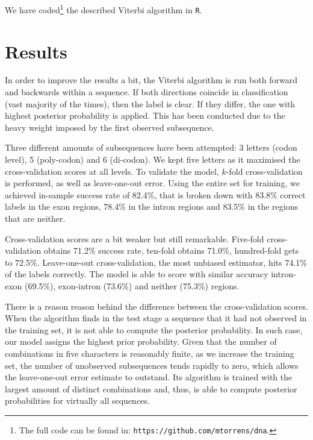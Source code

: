 \documentclass[a4paper, 11pt]{article} %
\begin{document}
We have coded\footnote{The full code can be found in: \texttt{https://github.com/mtorrens/dna}.} the described Viterbi algorithm in \texttt{R}. 

\section*{Results}

In order to improve the results a bit, the Viterbi algorithm is run both forward and backwards within a sequence. If both directions coincide in classification (vast majority of the times), then the label is clear. If they differ, the one with highest posterior probability is applied. This has been conducted due to the heavy weight imposed by the first observed subsequence.

Three different amounts of subsequences have been attempted: 3 letters (codon level), 5 (poly-codon) and 6 (di-codon). We kept five letters as it maximised the cross-validation scores at all levels. To validate the model, $k$-fold cross-validation is performed, as well as leave-one-out error. Using the entire set for training, we achieved in-sample success rate of 82.4\%, that is broken down with 83.8\% correct labels in the exon regions, 78.4\% in the intron regions and 83.5\% in the regions that are neither.

Cross-validation scores are a bit weaker but still remarkable. Five-fold cross-validation obtains 71.2\% success rate, ten-fold obtains 71.0\%, hundred-fold gets to 72.5\%. Leave-one-out cross-validation, the most unbiased estimator, hits 74.1\% of the labels correctly. The model is able to score with similar accuracy intron-exon (69.5\%), exon-intron (73.6\%) and neither (75.3\%) regions.

There is a reason reason behind the difference between the cross-validation scores. When the algorithm finds in the test stage a sequence that it had not observed in the training set, it is not able to compute the posterior probability. In such case, our model assigns the highest prior probability. Given that the number of combinations in five characters is reasonably finite, as we increase the training set, the number of unobserved subsequences tends rapidly to zero, which allows the leave-one-out error estimate to outstand. Its algorithm is trained with the largest amount of distinct combinations and, thus, is able to compute posterior probabilities for virtually all sequences.

\end{document}
